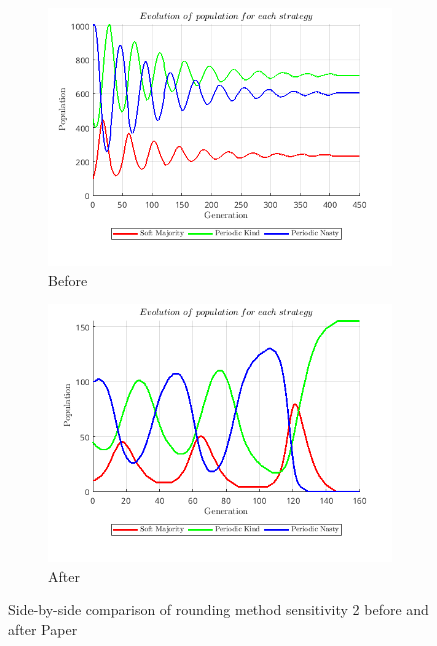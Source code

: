 \documentclass[12pt]{report}
\begin{document}
\begin{figure}[H]
    \centering
    \begin{subfigure}[t]{0.45\textwidth}
        \centering
        \includegraphics[width=\textwidth]{rounding_method_sensitivity_2_before_paper.png}
        \caption{Before}
    \end{subfigure}
    \hfill
    \begin{subfigure}[t]{0.45\textwidth}
        \centering
        \includegraphics[width=\textwidth]{rounding_method_sensitivity_2_after_paper.png}
        \caption{After}
    \end{subfigure}
    \caption{Side-by-side comparison of rounding method sensitivity 2 before and after Paper}
\end{figure}
\end{document}
